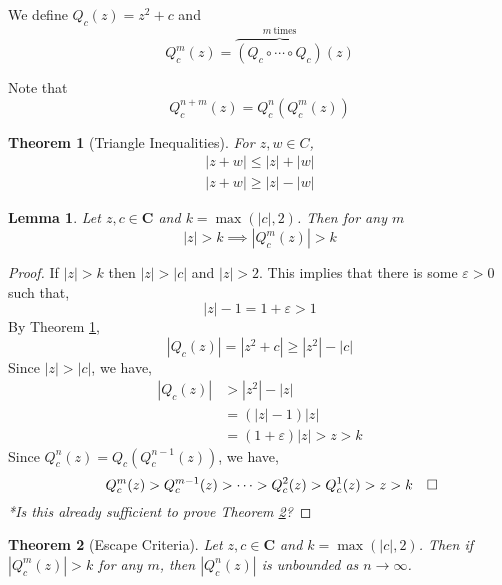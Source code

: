 \documentclass{article}
\newcommand{\setbold}{\mathbf}
\newcommand{\CC}{\setbold{C}}
\newtheorem{theorem}{Theorem}
\newtheorem{lemma}{Lemma}
\newcommand{\taggedqed}{\rlap{$\quad \Box$}}
\newcommand{\noqed}{\renewcommand{\qedsymbol}{}}
\begin{document}
We define $Q_c(z) = z^2 + c$ and \begin{equation*}
	Q_c^{m}(z) = \overbrace{(Q_c \circ \cdots \circ Q_c)}^{m\ \text{times}}(z)
	\label{eq:repeated-app}
\end{equation*}

Note that \begin{equation}
	Q_c^{n + m}(z) = Q_c^{n}(Q_c^{m}(z)) \label{eq:sum-rule}
\end{equation}

\begin{theorem}[Triangle Inequalities]
	\label{thm:triangle}
	For $z, w \in C$, 
	\begin{gather}
		|z + w| \le |z| + |w| \label{eq:triangle} \\
		|z + w| \ge |z| - |w| \label{eq:inverse-triangle}
	\end{gather}
\end{theorem}

\begin{lemma}
	\label{lem:lower-bound}
	Let $z, c \in \CC$ and $k = \max(|c|, 2)$.
	Then for any $m$ \begin{equation*}
		|z| > k \implies |Q_c^{m}(z)| > k \label{eq:lower-bound}
	\end{equation*}
\end{lemma}

\begin{proof}
	If $|z| > k$ then $|z| > |c|$ and $|z| > 2$.
	This implies that there is some $\varepsilon > 0$ such that,
	\begin{equation*}
		|z| - 1 = 1 + \varepsilon \label{eq:gt-epsilon} > 1
	\end{equation*}
	By Theorem \ref{thm:triangle}, \begin{equation*}
		|Q_c(z)| = |z^2 + c| \ge |z^2| - |c|
	\end{equation*}
	Since $|z| > |c|$, we have,
	\begin{align}
		|Q_c(z)| &> |z^2| - |z| \nonumber \\
				 &= (|z| - 1)|z| \nonumber \\
				 &= (1 + \varepsilon)|z| > z > k \label{eq:gt-k}
	\end{align}
	Since $Q_c^{n}(z) = Q_c(Q_c^{n - 1}(z))$, we have, \begin{equation}
		Q_c^{m}(z) > Q_c^{m - 1}(z) > \cdots > Q^2_c(z) > Q^{1}_c(z) > z > k \taggedqed \label{eq:strictly-inc}
	\end{equation}
	\textit{*Is this already sufficient to prove Theorem \ref{thm:escape-criteria}?}
	\noqed
\end{proof}

\begin{theorem}[Escape Criteria]
	\label{thm:escape-criteria}
	Let $z, c \in \CC$ and $k = \max(|c|, 2)$.
	Then if $|Q_c^{m}(z)| > k$ for any $m$,
	then $|Q_c^{n}(z)|$ is unbounded as $n \to \infty$.
\end{theorem}
% 
\end{document}
